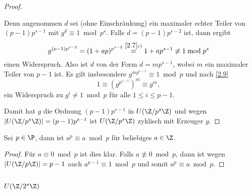 \begin{st}
\begin{proof}
\begin{itemize}[i)]
				Denn angenommen $d$ sei (ohne Einschränkung) ein maximaler echter Teiler von $(p-1)p^{s-1}$ mit $g^d \equiv 1 \bmod p^s$.
				Falls $d = (p-1)p^{s-2}$ ist, dann ergibt
				\[
					g^{(p-1)p^{s-2}} = (1 + ap)^{p^{s-2}} \stackrel{\ref{2.7} c)}\equiv 1 + ap^{s-1} \not\equiv 1 \bmod p^s
				\]
				einen Widerspruch.
				Also ist $d$ von der Form $d = mp^{s-1}$, wobei $m$ ein maximaler Teiler von $p-1$ ist.
				Es gilt insbesondere $g^{mp^{s-1}} \equiv 1 \bmod p$ und nach \ref{2.9}
				\[
					1 \equiv (g^{p^{s-1}})^m \equiv g^m,
				\]
				ein Widerspruch zu $g^i \neq 1 \bmod p$ für alle $1 \le i \le p - 1$.
		\end{itemize}
		Damit hat $g$ die Ordnung $(p-1)p^{s-1}$ in $U(\Z/p^s\Z)$ und wegen $|U(\Z/p^s\Z)| = (p-1)p^{s-1}$ ist $U(\Z/p^s \Z)$ zyklisch mit Erzeuger $g$.
	\end{proof}
\end{st}

\begin{lem} \label{2.9}
	Sei $p \in \P$, dann ist $a^p \equiv a \bmod p$ für beliebiges $a \in \Z$.
	\begin{proof}
		Für $a \equiv 0 \bmod p$ ist dies klar.
		Falls $a \not\equiv 0 \bmod p$, dann ist wegen $|U(\Z / p\Z)| = p - 1$ auch $a^{p-1} \equiv 1 \bmod p$ und somit $a^p \equiv a \bmod p$.
	\end{proof}
\end{lem}

\subsection{\texorpdfstring{$U(\Z/2^s \Z)$}{U(ℤ/2\textasciicircum sℤ)}}

